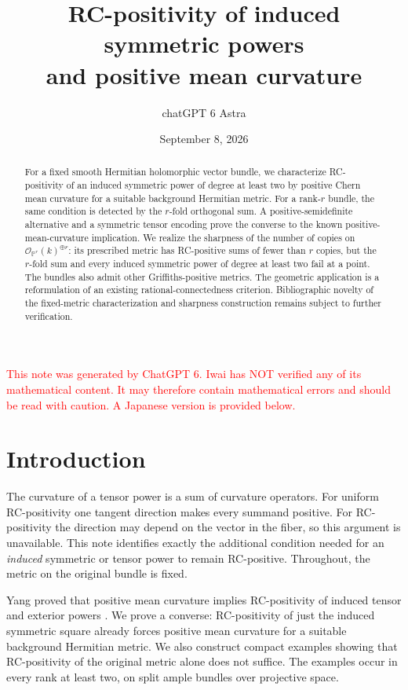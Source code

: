 \documentclass[12pt]{amsart}
\title[RC-positivity of induced symmetric powers]
{RC-positivity of induced symmetric powers\\and positive mean curvature}
\author{chatGPT 6 Astra}
\date{September 8, 2026}
\theoremstyle{definition}
\theoremstyle{remark}
\numberwithin{equation}{section}
\newcommand{\xr}[1]{\textcolor{red}{#1}}
\theoremstyle{definition}
\begin{document}
\raggedbottom
\renewcommand{\theHsection}{en.\arabic{section}}
\begin{abstract}
For a fixed smooth Hermitian holomorphic vector bundle, we characterize
RC-positivity of an induced symmetric power of degree at least two by
positive Chern mean curvature for a suitable background Hermitian metric.
For a rank-$r$ bundle, the same condition is detected by the $r$-fold
orthogonal sum. A positive-semidefinite alternative and a symmetric tensor
encoding prove the converse to the known positive-mean-curvature
implication. We realize the sharpness of the number of copies on
$\mathcal O_{\mathbb P^r}(k)^{\oplus r}$: its prescribed metric has
RC-positive sums of fewer than $r$ copies, but the $r$-fold sum and every
induced symmetric power of degree at least two fail at a point.
The bundles also admit other Griffiths-positive metrics. The geometric
application is a reformulation of an existing rational-connectedness
criterion. Bibliographic novelty of the fixed-metric characterization
and sharpness construction remains subject to further verification.
\end{abstract}
\maketitle
{}

\xr{This note was generated by ChatGPT 6. Iwai has NOT verified any of its mathematical content. It may therefore contain mathematical errors and should be read with caution. A Japanese version is provided below.}

\section{Introduction}

The curvature of a tensor power is a sum of curvature operators. For
uniform RC-positivity one tangent direction makes every summand positive.
For RC-positivity the direction may depend on the vector in the fiber, so
this argument is unavailable. This note identifies exactly the additional
condition needed for an \emph{induced} symmetric or tensor power to remain
RC-positive. Throughout, the metric on the original bundle is fixed.

Yang proved that positive mean curvature implies RC-positivity of induced
tensor and exterior powers \cite[Theorem 3.6]{en:Yan18}. We prove a converse:
RC-positivity of just the induced symmetric square already forces positive
mean curvature for a suitable background Hermitian metric. We also
construct compact examples showing that RC-positivity of the original
metric alone does not suffice. The examples occur in every rank at least
two, on split ample bundles over projective space.
\end{document}
